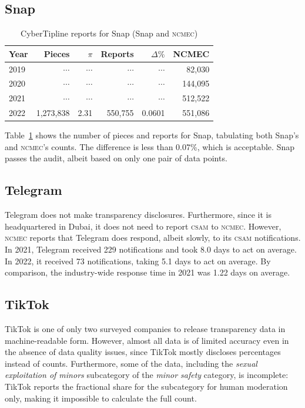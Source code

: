 \documentclass[nonacm,screen]{acmart}
\newcommand\V[1]{\textsc{\MakeLowercase{#1}}}
\begin{document}
\subsection{Snap}

\begin{table}[h!]
\centering\libertineLF
\caption{CyberTipline reports for Snap (Snap and \V{NCMEC})}
\label{tab:snap}
\begin{tabular}{l|rr|rrr}
\textbf{Year}
& \textbf{Pieces} & \textbf{$\pi$} & \textbf{Reports}
& \textbf{$\Delta\%$} & \textbf{NCMEC} \\ \hline
2019 & $\cdots$ & $\cdots$ & $\cdots$ & $\cdots$ & 82,030 \\
2020 & $\cdots$ & $\cdots$ & $\cdots$ & $\cdots$ & 144,095 \\
2021 & $\cdots$ & $\cdots$ & $\cdots$ & $\cdots$ & 512,522 \\
2022 & 1,273,838 & 2.31 & 550,755 & 0.0601 & 551,086 \\
\end{tabular}
\end{table}

\noindent{}Table~\ref{tab:snap} shows the number of pieces and reports for Snap,
tabulating both Snap's and \V{NCMEC}'s counts. The difference is less than
0.07\%, which is acceptable. Snap passes the audit, albeit based on only one
pair of data points.


\subsection{Telegram}

Telegram does not make transparency disclosures. Furthermore, since it is
headquartered in Dubai, it does not need to report \V{CSAM} to \V{NCMEC}.
However, \V{NCMEC} reports that Telegram does respond, albeit slowly, to its
\V{CSAM} notifications. In 2021, Telegram received 229 notifications and took
8.0 days to act on average. In 2022, it received 73 notifications, taking 5.1
days to act on average. By comparison, the industry-wide response time in 2021
was 1.22 days on average.


\subsection{TikTok}

TikTok is one of only two surveyed companies to release transparency data in
machine-readable form. However, almost all data is of limited accuracy even in
the absence of data quality issues, since TikTok mostly discloses percentages
instead of counts. Furthermore, some of the data, including the \emph{sexual
exploitation of minors} subcategory of the \emph{minor safety} category, is
incomplete: TikTok reports the fractional share for the subcategory for human
moderation only, making it impossible to calculate the full count.
\end{document}
